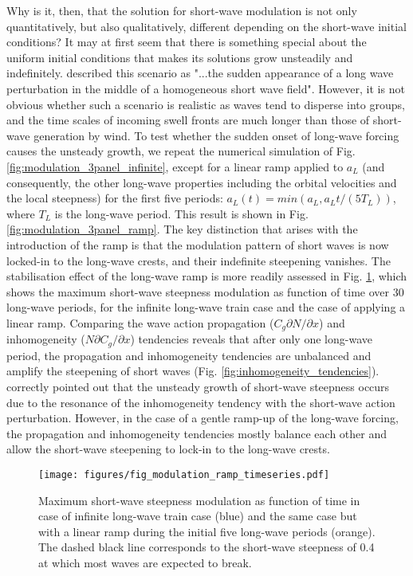 \documentclass[lineno]{jfm}
\begin{document}
Why is it, then, that the solution for short-wave modulation is not only
quantitatively, but also qualitatively, different depending on the short-wave
initial conditions?
It may at first seem that there is something special about the uniform initial
conditions that makes its solutions grow unsteadily and indefinitely.
\citet{peureux2021unsteady} described this scenario as "...the sudden appearance
of a long wave perturbation in the middle of a homogeneous short wave field".
However, it is not obvious whether such a scenario is realistic as waves tend to
disperse into groups, and the time scales of incoming swell fronts are much
longer than those of short-wave generation by wind.
To test whether the sudden onset of long-wave forcing causes the unsteady growth,
we repeat the numerical simulation of Fig.
\ref{fig:modulation_3panel_infinite}, except for a linear ramp applied to $a_L$
(and consequently, the other long-wave properties including the orbital
velocities and the local steepness) for the first five periods:
$a_L(t) = min(a_L, a_L t / \left(5 T_L\right))$, where $T_L$ is the long-wave period.
This result is shown in Fig. \ref{fig:modulation_3panel_ramp}.
The key distinction that arises with the introduction of the ramp is that the
modulation pattern of short waves is now locked-in to the long-wave crests,
and their indefinite steepening vanishes.
The stabilisation effect of the long-wave ramp is more readily assessed in
Fig. \ref{fig:unsteady_growth_timeseries}, which shows the maximum short-wave
steepness modulation as function of time over 30 long-wave periods, for the
infinite long-wave train case and the case of applying a linear ramp.
Comparing the wave action propagation ($C_g \partial N / \partial x$) and
inhomogeneity ($N \partial C_g / \partial x$) tendencies reveals that
after only one long-wave period, the propagation and inhomogeneity tendencies
are unbalanced and amplify the steepening of short waves
(Fig. \ref{fig:inhomogeneity_tendencies}).
\citet{peureux2021unsteady} correctly pointed out that the unsteady growth of
short-wave steepness occurs due to the resonance of the inhomogeneity
tendency with the short-wave action perturbation.
However, in the case of a gentle ramp-up of the long-wave forcing, the
propagation and inhomogeneity tendencies mostly balance each other and allow
the short-wave steepening to lock-in to the long-wave crests.

\begin{figure}
  \centering
  \texttt{[image: figures/fig\_modulation\_ramp\_timeseries.pdf]}
  \caption{
    Maximum short-wave steepness modulation as function of time in case of
    infinite long-wave train case (blue) and the same case but with a linear
    ramp during the initial five long-wave periods (orange). The dashed black
    line corresponds to the short-wave steepness of 0.4 at which most waves are
    expected to break.
  }
  \label{fig:unsteady_growth_timeseries}
\end{figure}
\end{document}
